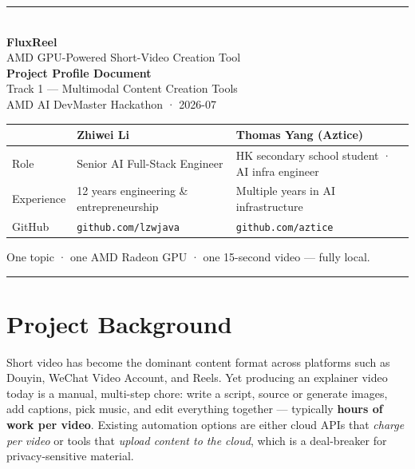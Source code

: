 \documentclass[UTF8,fontset=mac,a4paper,11pt]{ctexart}
\begin{document}
\begin{titlepage}
  \centering
  {\color{amdred}\rule{\linewidth}{2.5pt}}\\[2.4em]
  {\Huge\bfseries FluxReel}\\[0.7em]
  {\LARGE AMD GPU-Powered Short-Video Creation Tool}\\[2.2em]
  {\large\bfseries Project Profile Document}\\[0.5em]
  {\large Track 1 --- Multimodal Content Creation Tools}\\[1.0em]
  {\large AMD AI DevMaster Hackathon · 2026-07}\\[3.2em]

  \begin{tabular}{@{}l l l@{}}
    \toprule
    & \textbf{Zhiwei Li} & \textbf{Thomas Yang (Aztice)} \\
    \midrule
    Role
      & Senior AI Full-Stack Engineer
      & HK secondary school student · AI infra engineer \\
    Experience
      & 12 years engineering \& entrepreneurship
      & Multiple years in AI infrastructure \\
    GitHub
      & \texttt{github.com/lzwjava}
      & \texttt{github.com/aztice} \\
    \bottomrule
  \end{tabular}

  \vfill
  {\small\color{dimgray}
   One topic · one AMD Radeon GPU · one 15-second video — fully local.}\\[0.6em]
  {\color{amdred}\rule{\linewidth}{2.5pt}}
\end{titlepage}

\section{Project Background}

Short video has become the dominant content format across platforms such as
Douyin, WeChat Video Account, and Reels. Yet producing an explainer video
today is a manual, multi-step chore: write a script, source or generate
images, add captions, pick music, and edit everything together --- typically
\textbf{hours of work per video}. Existing automation options are either
cloud APIs that \emph{charge per video} or tools that \emph{upload content
to the cloud}, which is a deal-breaker for privacy-sensitive material.
\end{document}
